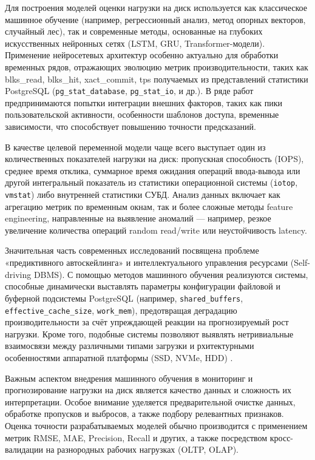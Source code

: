 Для построения моделей оценки нагрузки на диск используется как классическое машинное обучение (например, регрессионный анализ, метод опорных векторов, случайный лес),
так и современные методы, основанные на глубоких искусственных нейронных сетях (LSTM, GRU, Transformer-модели). 
Применение нейросетевых архитектур особенно актуально для обработки временных рядов, отражающих эволюцию метрик производительности, 
таких как blks\_read, blks\_hit, xact\_commit, tps получаемых из представлений статистики PostgreSQL (\texttt{pg\_stat\_database}, 
\texttt{pg\_stat\_io}, и др.). В ряде работ предпринимаются попытки интеграции внешних факторов, таких как пики пользовательской активности, 
особенности шаблонов доступа, временные зависимости, что способствует повышению точности предсказаний\cite{sun2023predictive}.

В качестве целевой переменной модели чаще всего выступает один из количественных показателей нагрузки на диск: 
пропускная способность (IOPS), среднее время отклика, суммарное время ожидания операций ввода-вывода или другой интегральный 
показатель из статистики операционной системы (\texttt{iotop}, \texttt{vmstat}) либо внутренней статистики СУБД. 
Анализ данных включает как агрегацию метрик по временным окнам, так и более сложные методы feature engineering, 
направленные на выявление аномалий — например, резкое увеличение количества операций random read/write или неустойчивость latency.

Значительная часть современных исследований посвящена проблеме «предиктивного автоскейлинга» и интеллектуального управления 
ресурсами (Self-driving DBMS). С помощью методов машинного обучения реализуются системы, способные динамически выставлять 
параметры конфигурации файловой и буферной подсистемы PostgreSQL (например, \texttt{shared\_buffers}, \texttt{effective\_cache\_size}, \texttt{work\_mem}), 
предотвращая деградацию производительности за счёт упреждающей реакции на прогнозируемый рост нагрузки. 
Кроме того, подобные системы позволяют выявлять нетривиальные взаимосвязи между различными типами загрузки и 
рхитектурными особенностями аппаратной платформы (SSD, NVMe, HDD) \cite{ozkaya2020deep}.

Важным аспектом внедрения машинного обучения в мониторинг и прогнозирование нагрузки на диск является качество данных и сложность их интерпретации. 
Особое внимание уделяется предварительной очистке данных, обработке пропусков и выбросов, а также подбору релевантных признаков. 
Оценка точности разрабатываемых моделей обычно производится с применением метрик RMSE, MAE, Precision, Recall и других, 
а также посредством кросс-валидации на разнородных рабочих нагрузках (OLTP, OLAP).

